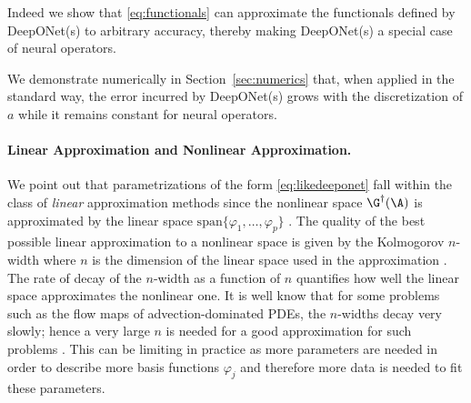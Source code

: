 Indeed we show that \eqref{eq:functionals} can approximate the functionals defined by DeepONet(s) to arbitrary accuracy, thereby making DeepONet(s) a special case of neural operators.  

\fi


 We demonstrate numerically in Section~\ref{sec:numerics} that, when applied in the standard way, the error incurred by DeepONet(s) grows with the  discretization of \(a\) while it remains constant for neural operators.

\paragraph{Linear Approximation and Nonlinear Approximation.}
We point out that parametrizations of the form \eqref{eq:likedeeponet} fall within the class of \textit{linear} approximation methods since the nonlinear space \(\G^\dagger(\A)\) is approximated by the linear space \(\text{span}\{\varphi_1,\dots,\varphi_p\}\) \citep{devore1998nonlinear}. The quality of the best possible linear approximation to a nonlinear space is given by the Kolmogorov \(n\)-width where \(n\) is the dimension of the linear space used in the approximation \citep{pinkus1985nwidths}. The rate of decay of the \(n\)-width as a function of \(n\) quantifies how well the linear space approximates the nonlinear one. It is well know that for some problems such as the flow maps of advection-dominated PDEs, the \(n\)-widths decay very slowly; hence a very large \(n\) is needed for a good approximation for such problems \citep{cohendevore}. This can be limiting in practice as more parameters are needed in order to describe more basis functions \(\varphi_j\) and therefore more data is needed to fit these parameters. 

